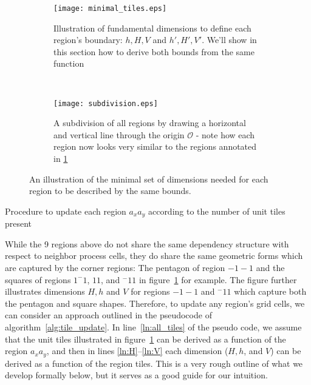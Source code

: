\begin{figure}[ht]
  \centering
  \begin{subfigure}[ht]{.5\textwidth}
    \centering
    \texttt{[image: minimal\_tiles.eps]}
    \caption{Illustration of fundamental dimensions to define each region's boundary: $h,H,V$ and
    $h',H',V'$.  We'll show in this section how to derive both bounds from the same function}\label{subfig:mintile}
  \end{subfigure}
  ~
  \begin{subfigure}[ht]{.4\textwidth}
    \centering
    \texttt{[image: subdivision.eps]}
    \caption{A subdivision of all regions by drawing a horizontal and vertical line through the origin
    $\mathcal{O}$ - note how each region now looks very similar to the regions annotated in \ref{subfig:mintile}}
    \label{subfig:subdivision}
    \end{subfigure}
  \caption{An illustration of the minimal set of dimensions needed for each region to be described by the same
  bounds.}
  \label{fig:tiles}
\end{figure}

\begin{algorithm}[h]
  \setcounter{AlgoLine}{0}
  \caption{Procedure to update each region $a_xa_y$ according to the number of unit tiles present}
  \label{alg:tile_update}
\end{algorithm}


While the 9 regions above do not share the same dependency structure with respect to neighbor process cells,
they do share the same geometric forms which are captured by the corner regions: The pentagon of region
$-1-1$ and the squares of regions $1^-1$, $11$, and $^-11$ in figure~\ref{subfig:mintile} for example.
  The figure further illustrates dimensions
$H,h$ and $V$ for regions $-1-1$ and $^-11$ which capture both the pentagon and square shapes.
Therefore, to update any
region's grid cells, we can consider an approach outlined in the pseudocode
of algorithm~\ref{alg:tile_update}.
  In line~\ref{ln:all_tiles} of the pseudo code, we assume that the unit tiles
 illustrated in figure~\ref{subfig:mintile} can be derived as a function of
 the region $a_xa_y$, and then in lines \ref{ln:H}--\ref{ln:V} each dimension
 ($H,h$, and $V$) can
 be derived as a function of the region tiles.  This is a
 very rough outline of
 what we develop formally below, but it serves as a good guide for our
 intuition.

